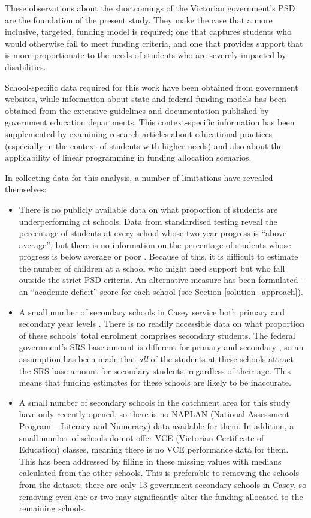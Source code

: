 \documentclass[11pt, a4paper]{article}
\begin{document}
    These observations about the shortcomings of the Victorian government's PSD are the foundation of the present study. They make the case that a more inclusive, targeted, funding model is required; one that captures students who would otherwise fail to meet funding criteria, and one that provides support that is more proportionate to the needs of students who are severely impacted by disabilities.

    School-specific data required for this work have been obtained from government websites, while information about state and federal funding models has been obtained from the extensive guidelines and documentation published by government education departments. This context-specific information has been supplemented by examining research articles about educational practices (especially in the context of students with higher needs) and also about the applicability of linear programming in funding allocation scenarios.

    In collecting data for this analysis, a number of limitations have revealed themselves:

    \begin{itemize}
        \item There is no publicly available data on what proportion of students are underperforming at schools. Data from standardised testing reveal the percentage of students at every school whose two-year progress is ``above average'', but there is no information on the percentage of students whose progress is below average or poor \parencite{naplan}. Because of this, it is difficult to estimate the number of children at a school who might need support but who fall outside the strict PSD criteria. An alternative measure has been formulated - an ``academic deficit'' score for each school (see Section \ref{solution_approach}).
        \item A small number of secondary schools in Casey service both primary and secondary year levels \parencite{casey_schools}. There is no readily accessible data on what proportion of these schools' total enrolment comprises secondary students. The federal government's SRS base amount is different for primary and secondary \parencite{srs_2020}, so an assumption has been made that \textit{all} of the students at these schools attract the SRS base amount for secondary students, regardless of their age. This means that funding estimates for these schools are likely to be inaccurate.
        \item A small number of secondary schools in the catchment area for this study have only recently opened, so there is no NAPLAN (National Assessment Program – Literacy and Numeracy) data available for them. In addition, a small number of schools do not offer VCE (Victorian Certificate of Education) classes, meaning there is no VCE performance data for them. This has been addressed by filling in these missing values with medians calculated from the other schools. This is preferable to removing the schools from the dataset; there are only 13 government secondary schools in Casey, so removing even one or two may significantly alter the funding allocated to the remaining schools.
    \end{itemize}
\end{document}
